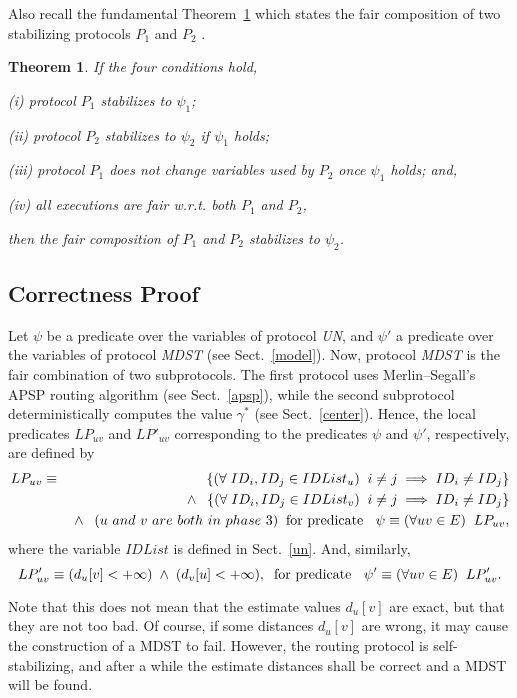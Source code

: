 \documentclass[10pt]{article}
\newtheorem{thm}{Theorem}[section]
\begin{document}
Also recall the fundamental Theorem~\ref{thm:comp} which states the
fair composition of two stabilizing protocols $P_1$ and $P_2$ \cite{DoIM93}.
\begin{thm}\label{thm:comp}
If the four conditions hold,

(i) protocol $P_1$ stabilizes to $\psi_1$;

(ii) protocol $P_2$ stabilizes to $\psi_2$ if $\psi_1$ holds;

(iii) protocol $P_1$ does not change variables used by $P_2$ once
$\psi_1$ holds; and,

(iv) all executions are fair w.r.t. both $P_1$ and $P_2$,

then the fair composition of $P_1$ and $P_2$ stabilizes to $\psi_2$.
\end{thm}

\subsection{Correctness Proof}\label{correct}
Let $\psi$ be a predicate over the variables of protocol {\em UN},
and $\psi'$ a predicate over the variables of protocol {\em MDST}
(see Sect.~\ref{model}). Now, protocol {\em MDST} is the fair combination
of two subprotocols. The first protocol uses Merlin--Segall's APSP routing
algorithm (see Sect.~\ref{apsp}),
while the second subprotocol deterministically
computes the value $\gamma^*$ (see Sect.~\ref{center}). Hence, the local
predicates $LP_{uv}$ and $LP'_{uv}$ corresponding to the predicates
$\psi$ and $\psi'$, respectively, are defined by
\begin{eqnarray*}
LP_{uv} & \equiv & \left\{(\forall \; ID_i, ID_j \in IDList_u )\;\; i\not= j\;
\Longrightarrow \; ID_i \not= ID_j\right\}\\
& &\mbox{} \land  \;\; \left\{(\forall \;
ID_i, ID_j \in IDList_v) \;\; i\not = j\;
\Longrightarrow\; ID_i\not= ID_j\right\}\\
& & \mbox{} \land \;\; (u\ and\ v\ are\ both\ in\ phase\ 3) \; \;
\mbox{\rm for predicate}\ \; \; \psi\equiv (\forall uv \in E) \;\; LP_{uv},
\end{eqnarray*}
where the variable $IDList$ is defined in Sect.~\ref{un}.
And, similarly,
$$LP'_{uv} \equiv (d_u[v] < +\infty) \; \land \; (d_v[u] < +\infty),\; \;
\mbox{\rm for predicate}\ \; \; \psi' \equiv (\forall uv \in E) \; \; LP'_{uv}.$$

Note that this does not mean that the estimate values $d_u[v]$ are exact,
but that they are not too bad. Of course, if some distances $d_u[v]$ are
wrong, it may cause the construction of a MDST to fail. However, the
routing protocol is self-stabilizing, and after a while the estimate
distances shall be correct and a MDST will be found.
\end{document}
